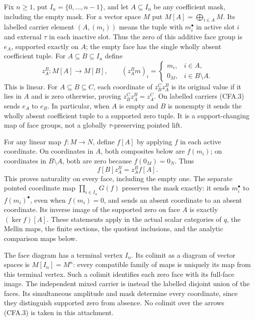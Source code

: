 Fix $n\ge1$, put $I_n=\{0,\ldots,n-1\}$, and let $A\subseteq I_n$
be any coefficient mask, including the empty mask.  For a vector space
$M$ put $M[A]=\bigoplus_{i\in A}M$.  Its labelled carrier element
$(A,(m_i))$ means the tuple with $m_i^\bullet$ in active slot $i$
and external $\tau$ in each inactive slot.  Thus the zero of this
additive face group is $e_A$, supported exactly on $A$; the empty
face has the single wholly absent coefficient tuple.
For $A\subseteq B\subseteq I_n$ define
\[
 z_A^B:M[A]\longrightarrow M[B],\qquad
 (z_A^Bm)_i=
 \begin{cases}m_i,&i\in A,\\0_M,&i\in B\setminus A.
 \end{cases}                                                   \tag{CFA.3}
\]
This is linear.  For $A\subseteq B\subseteq C$, each coordinate of
$z_B^Cz_A^B$ is its original value if it lies in $A$ and is zero
otherwise, proving $z_B^Cz_A^B=z_A^C$.
On labelled carriers (CFA.3) sends $e_A$ to $e_B$.  In particular,
when $A$ is empty and $B$ is nonempty it sends the wholly absent
coefficient tuple to a supported zero tuple.  It is a support-changing
map of face groups, not a globally $\tau$-preserving pointed lift.

For any linear map $f:M\to N$, define $f[A]$ by applying $f$ in each
active coordinate.  On coordinates in $A$, both composites below are
$f(m_i)$; on coordinates in $B\setminus A$, both are zero because
$f(0_M)=0_N$.  Thus
\[
 f[B]z_A^B=z_A^Bf[A].                                         \tag{CFA.4}
\]
This proves naturality on every face, including the empty one.
The separate pointed coordinate map $\prod_{i\in I_n}G(f)$ preserves
the mask exactly: it sends $m_i^\bullet$ to $f(m_i)^\bullet$, even
when $f(m_i)=0$, and sends an absent coordinate to an absent coordinate.
Its inverse image of the supported zero on face $A$ is exactly
$(\ker f)[A]$.  These statements apply in the actual scalar categories
of $q$, the Mellin maps, the finite sections, the quotient inclusions,
and the analytic comparison maps below.

The face diagram has a terminal vertex $I_n$.  Its colimit as a diagram
of vector spaces is $M[I_n]=M^n$: every compatible family of maps is
uniquely its map from this terminal vertex.  Such a colimit identifies
each zero face with its full-face image.  The independent mixed carrier
is instead the labelled disjoint union of the faces.  Its simultaneous
amplitude and mask determine every coordinate, since they distinguish
supported zero from absence.  No colimit over the arrows (CFA.3) is
taken in this attachment.

